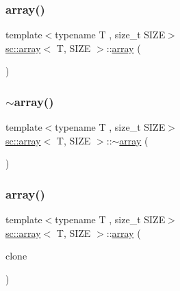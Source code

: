 \subsubsection{\texorpdfstring{array()}{array()}\hspace{0.1cm}{\footnotesize\ttfamily [1/3]}}
{\footnotesize\ttfamily template$<$typename T , size\+\_\+t S\+I\+ZE$>$ \\
\hyperlink{classsc_1_1array}{sc\+::array}$<$ T, S\+I\+ZE $>$\+::\hyperlink{classsc_1_1array}{array} (\begin{DoxyParamCaption}{ }\end{DoxyParamCaption})\hspace{0.3cm}{\ttfamily [inline]}}

\mbox{\label{classsc_1_1array_a291846a1b0777313c28f0c259e68e19f}} 
\subsubsection{\texorpdfstring{$\sim$array()}{~array()}}
{\footnotesize\ttfamily template$<$typename T , size\+\_\+t S\+I\+ZE$>$ \\
\hyperlink{classsc_1_1array}{sc\+::array}$<$ T, S\+I\+ZE $>$\+::$\sim$\hyperlink{classsc_1_1array}{array} (\begin{DoxyParamCaption}{ }\end{DoxyParamCaption})\hspace{0.3cm}{\ttfamily [inline]}}

\mbox{\label{classsc_1_1array_a2bed3ac7be339da876fbcff64e5ca6c4}} 
\subsubsection{\texorpdfstring{array()}{array()}\hspace{0.1cm}{\footnotesize\ttfamily [2/3]}}
{\footnotesize\ttfamily template$<$typename T , size\+\_\+t S\+I\+ZE$>$ \\
\hyperlink{classsc_1_1array}{sc\+::array}$<$ T, S\+I\+ZE $>$\+::\hyperlink{classsc_1_1array}{array} (\begin{DoxyParamCaption}\item[{const \hyperlink{classsc_1_1array}{array}$<$ T, S\+I\+ZE $>$ \&}]{clone }\end{DoxyParamCaption})\hspace{0.3cm}{\ttfamily [inline]}}

